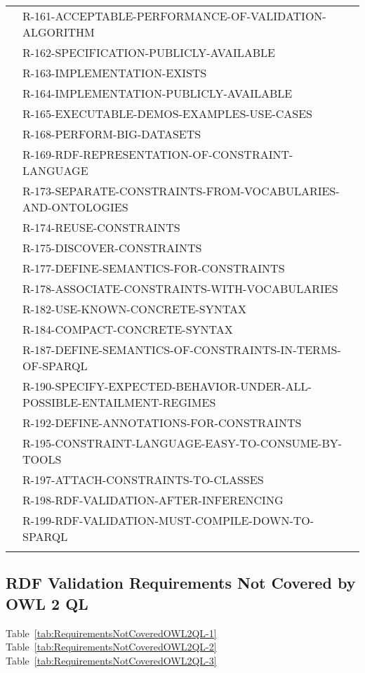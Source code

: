 \documentclass{llncs}
\newcommand{\hr}{\hline\noalign{\smallskip}} %
\begin{document}
\begin{table}
\begin{tabular}{ll}
& R-161-ACCEPTABLE-PERFORMANCE-OF-VALIDATION-ALGORITHM \\
& R-162-SPECIFICATION-PUBLICLY-AVAILABLE \\
& R-163-IMPLEMENTATION-EXISTS \\
& R-164-IMPLEMENTATION-PUBLICLY-AVAILABLE \\
& R-165-EXECUTABLE-DEMOS-EXAMPLES-USE-CASES \\
& R-168-PERFORM-BIG-DATASETS \\
& R-169-RDF-REPRESENTATION-OF-CONSTRAINT-LANGUAGE \\
& R-173-SEPARATE-CONSTRAINTS-FROM-VOCABULARIES-AND-ONTOLOGIES \\
& R-174-REUSE-CONSTRAINTS \\
& R-175-DISCOVER-CONSTRAINTS \\
& R-177-DEFINE-SEMANTICS-FOR-CONSTRAINTS \\
& R-178-ASSOCIATE-CONSTRAINTS-WITH-VOCABULARIES \\
& R-182-USE-KNOWN-CONCRETE-SYNTAX \\
& R-184-COMPACT-CONCRETE-SYNTAX \\
& R-187-DEFINE-SEMANTICS-OF-CONSTRAINTS-IN-TERMS-OF-SPARQL \\
& R-190-SPECIFY-EXPECTED-BEHAVIOR-UNDER-ALL-POSSIBLE-ENTAILMENT-REGIMES \\
& R-192-DEFINE-ANNOTATIONS-FOR-CONSTRAINTS \\
& R-195-CONSTRAINT-LANGUAGE-EASY-TO-CONSUME-BY-TOOLS \\
& R-197-ATTACH-CONSTRAINTS-TO-CLASSES \\
& R-198-RDF-VALIDATION-AFTER-INFERENCING \\
& R-199-RDF-VALIDATION-MUST-COMPILE-DOWN-TO-SPARQL \\
\hr
\end{tabular}
\end{table}

\subsection{RDF Validation Requirements Not Covered by OWL 2 QL}

Table~\ref{tab:RequirementsNotCoveredOWL2QL-1}
Table~\ref{tab:RequirementsNotCoveredOWL2QL-2}
Table~\ref{tab:RequirementsNotCoveredOWL2QL-3}
\end{document}
